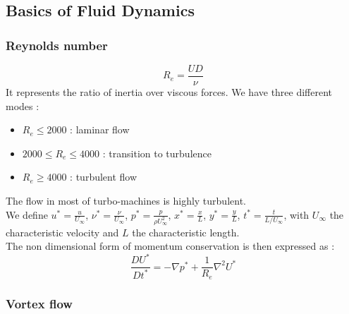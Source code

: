 \documentclass[../main.tex]{subfiles}
\begin{document}
\subsection{Basics of Fluid Dynamics}

\subsubsection{Reynolds number}
\begin{equation}
    R_e = \frac{UD}{\nu}
\end{equation}
It represents the ratio of inertia over viscous forces. We have three different modes : \begin{itemize}
    \item $R_e \leq 2000$ : laminar flow
    \item $2000 \leq R_e \leq 4000$ : transition to turbulence
    \item $R_e \geq 4000$ : turbulent flow
\end{itemize}
\warning The flow in most of turbo-machines is highly turbulent.\\

We define $u^* = \frac{u}{U_\infty}$, $\nu^* = \frac{\nu}{U_\infty}$, $p^* = \frac{p}{\rho U_\infty^2}$, $x^* = \frac{x}{L}$, $y^* = \frac{y}{L}$, $t^* = \frac{t}{L/U_\infty}$, with $U_\infty$ the characteristic velocity and $L$ the characteristic length.\\
The non dimensional form of momentum conservation is then expressed as : \begin{equation}
    \frac{DU^*}{Dt^*} = -\nabla p^* + \frac{1}{R_e} \nabla^2 U^*
\end{equation}

\subsubsection{Vortex flow}
\end{document}
